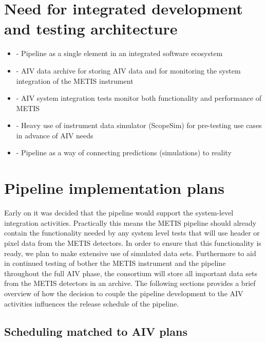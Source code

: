 \documentclass[a4paper]{spie}  %
\begin{document}
\section{Need for integrated development and testing architecture}
\label{sec:dev}

\begin{itemize}
    \item - Pipeline as a single element in an integrated software ecosystem
    \item - AIV data archive for storing AIV data and for monitoring the system integration of the METIS instrument
    \item - AIV system integration tests monitor both functionality and performance of METIS
    \item - Heavy use of instrument data simulator (ScopeSim) for pre-testing use cases in advance of AIV needs
    \item - Pipeline as a way of connecting predictions (simulations) to reality
\end{itemize}


\section{Pipeline implementation plans}
\label{sec:imp}

Early on it was decided that the pipeline would support the system-level integration activities.
Practically this means the METIS pipeline should already contain the functionality needed by any system level tests that will use header or pixel data from the METIS detectors.
In order to ensure that this functionality is ready, we plan to make extensive use of simulated data sets. 
Furthermore to aid in continued testing of bother the METIS instrument and the pipeline throughout the full AIV phase, the consortium will store all important data sets from the METIS detectors in an archive.
The following sections provides a brief overview of how the decision to couple the pipeline development to the AIV activities influences the release schedule of the pipeline.

\subsection{Scheduling matched to AIV plans}
\label{subsec:imp_aiv}
\end{document}
